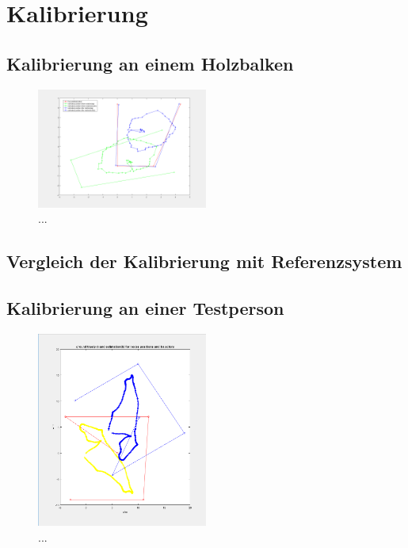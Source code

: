 \newpage
	
\section{Kalibrierung}

	\subsection{Kalibrierung an einem Holzbalken}
	
	\begin{figure}[h]
		\centering
		\includegraphics[width=0.5\textwidth]{images/KalibrierungHolzgestell}
		\caption[Kalibrierung an einem Holzbalken]{...}
		\label{img:holzbalken}
	\end{figure}

	\subsection{Vergleich der Kalibrierung mit Referenzsystem}

\newpage

	\subsection{Kalibrierung an einer Testperson}
	
	\begin{figure}[h]
		\centering
		\includegraphics[width=0.5\textwidth]{images/Kalibrierung_Testperson}
		\caption[Kalibrierung an einer Testperson]{...}
		\label{img:testperson}
	\end{figure}